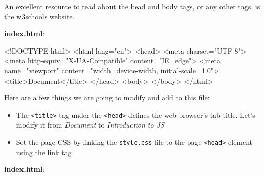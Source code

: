 \documentclass[
  letterpaper,
  DIV=11,
  numbers=noendperiod]{scrreprt}
\newenvironment{Shaded}{\begin{snugshade}}{\end{snugshade}}
\newcommand{\DataTypeTok}[1]{\textcolor[rgb]{0.68,0.00,0.00}{#1}}
\newcommand{\ErrorTok}[1]{\textcolor[rgb]{0.68,0.00,0.00}{#1}}
\newcommand{\KeywordTok}[1]{\textcolor[rgb]{0.00,0.23,0.31}{#1}}
\newcommand{\NormalTok}[1]{\textcolor[rgb]{0.00,0.23,0.31}{#1}}
\newcommand{\OtherTok}[1]{\textcolor[rgb]{0.00,0.23,0.31}{#1}}
\newcommand{\StringTok}[1]{\textcolor[rgb]{0.13,0.47,0.30}{#1}}
\providecommand{\tightlist}{%
  \setlength{\itemsep}{0pt}\setlength{\parskip}{0pt}}\usepackage{longtable,booktabs,array}
\begin{document}
An excellent resource to read about the
\href{https://www.w3schools.com/tags/tag_head.asp}{head} and
\href{https://www.w3schools.com/tags/tag_body.asp}{body} tags, or any
other tags, is the
\href{https://www.w3schools.com/html/default.asp}{w3schools website}.

\textbf{index.html}:

\begin{Shaded}
\begin{Highlighting}[]
\DataTypeTok{\textless{}!DOCTYPE }\NormalTok{html}\DataTypeTok{\textgreater{}}
\KeywordTok{\textless{}html} \ErrorTok{lang}\OtherTok{=}\StringTok{"en"}\KeywordTok{\textgreater{}}
\KeywordTok{\textless{}head\textgreater{}}
    \KeywordTok{\textless{}meta} \ErrorTok{charset}\OtherTok{=}\StringTok{"UTF{-}8"}\KeywordTok{\textgreater{}}
    \KeywordTok{\textless{}meta} \ErrorTok{http{-}equiv}\OtherTok{=}\StringTok{"X{-}UA{-}Compatible"} \ErrorTok{content}\OtherTok{=}\StringTok{"IE=edge"}\KeywordTok{\textgreater{}}
    \KeywordTok{\textless{}meta} \ErrorTok{name}\OtherTok{=}\StringTok{"viewport"} \ErrorTok{content}\OtherTok{=}\StringTok{"width=device{-}width, initial{-}scale=1.0"}\KeywordTok{\textgreater{}}
    \KeywordTok{\textless{}title\textgreater{}}\NormalTok{Document}\KeywordTok{\textless{}/title\textgreater{}}
\KeywordTok{\textless{}/head\textgreater{}}
\KeywordTok{\textless{}body\textgreater{}}
\KeywordTok{\textless{}/body\textgreater{}}
\KeywordTok{\textless{}/html\textgreater{}}
\end{Highlighting}
\end{Shaded}

Here are a few things we are going to modify and add to this file:

\begin{itemize}
\tightlist
\item
  The \texttt{\textless{}title\textgreater{}} tag under the
  \texttt{\textless{}head\textgreater{}} defines the web browser's tab
  title. Let's modify it from \emph{Document} to \emph{Introduction to
  JS}
\item
  Set the page CSS by linking the \texttt{style.css} file to the page
  \texttt{\textless{}head\textgreater{}} element using the
  \href{https://www.w3schools.com/tags/tag_link.asp}{link} tag
\end{itemize}

\textbf{index.html}:
\end{document}
